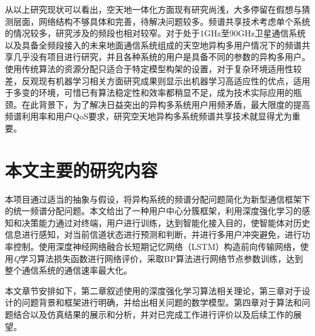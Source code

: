 从以上研究现状可以看出，空天地一体化方面现有研究尚浅，大多停留在假想与猜测层面，网络结构不够具体和完善，待解决问题较多。频谱共享技术考虑单个系统的情况较多，研究涉及的频段也相对较窄。对于处于1GHz至90GHz卫星通信系统以及具备全频段接入的未来地面通信系统组成的天空地异构多用户情况下的频谱共享几乎没有项目进行研究，并且各种系统的用户是具备不同的参数的异构多用户。使用传统算法的资源分配只适合于特定模型构架的设置，对于复杂环境适用性较差，反观现有机器学习相关方面研究成果则显示出机器学习高适应性的优点，适用于多变的环境，可惜已有算法稳定性和效率都稍显不足，成为技术实际应用的瓶颈。在此背景下，为了解决日益突出的异构多系统用户用频矛盾，最大限度的提高频谱利用率和用户QoS要求，研究空天地异构多系统频谱共享技术就显得尤为重要。

\section{本文主要的研究内容}

本项目通过适当的抽象与假设，将异构系统的频谱分配问题简化为新型通信框架下的统一频谱分配问题。本文给出了一种用户中心分簇框架，利用深度强化学习的感知和决策能力通过对终端，用户进行训练，达到智能化接入目的，使智能体对历史信息进行感知，对当前信道状态进行预测和判断，并进行多用户冲突避免，进行功率控制。使用深度神经网络融合长短期记忆网络（LSTM）构造前向传输网络，使用\textit{Q}学习算法损失函数进行网络评价，采取BP算法进行网络节点参数训练，达到整个通信系统的通信速率最大化。

本文章节安排如下，第二章叙述使用的深度强化学习算法相关理论，第三章对于设计的问题背景和框架进行明确，并给出相关问题的数学模型。第四章对于算法和问题结合以及仿真结果的展示和分析，并对已完成工作进行评价以及后续工作的展望。